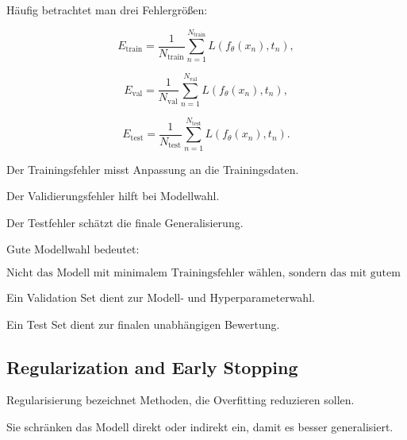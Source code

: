 \documentclass[11pt,a4paper]{scrartcl}
\begin{document}
\begin{calculationbox}
    Häufig betrachtet man drei Fehlergrößen:

    \[
        E_{\mathrm{train}}
        =
        \frac{1}{N_{\mathrm{train}}}
        \sum_{n=1}^{N_{\mathrm{train}}}
        L(f_\theta(x_n),t_n),
    \]

    \[
        E_{\mathrm{val}}
        =
        \frac{1}{N_{\mathrm{val}}}
        \sum_{n=1}^{N_{\mathrm{val}}}
        L(f_\theta(x_n),t_n),
    \]

    \[
        E_{\mathrm{test}}
        =
        \frac{1}{N_{\mathrm{test}}}
        \sum_{n=1}^{N_{\mathrm{test}}}
        L(f_\theta(x_n),t_n).
    \]

    Der Trainingsfehler misst Anpassung an die Trainingsdaten.

    Der Validierungsfehler hilft bei Modellwahl.

    Der Testfehler schätzt die finale Generalisierung.
\end{calculationbox}

\begin{answerbox}
    Gute Modellwahl bedeutet:

    \[
        \boxed{
            \text{Nicht das Modell mit minimalem Trainingsfehler wählen,
            sondern das mit gutem Validierungsfehler.}
        }
    \]

    Ein Validation Set dient zur Modell- und Hyperparameterwahl.

    Ein Test Set dient zur finalen unabhängigen Bewertung.
\end{answerbox}

\subsection{Regularization and Early Stopping}

\begin{notebox}
    Regularisierung bezeichnet Methoden, die Overfitting reduzieren sollen.

    Sie schränken das Modell direkt oder indirekt ein, damit es besser
    generalisiert.
\end{notebox}
\end{document}
